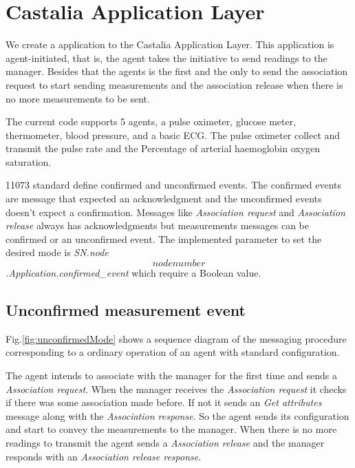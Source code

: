 \section{Castalia Application Layer}

We create a application to the Castalia Application Layer. This application is agent-initiated, that is, the agent takes the initiative to send readings to the manager. Besides that the agents is the first and the only to send the association request to start sending measurements and the association release when there is no more measurements to be sent.

The current code supports 5 agents, a pulse oximeter, glucose meter, thermometer, blood pressure, and a basic ECG. The pulse oximeter collect and transmit the pulse rate and the Percentage of arterial haemoglobin oxygen saturation.

11073 standard define confirmed and unconfirmed events. The confirmed events are message that expected an acknowledgment and the unconfirmed events doesn't expect a confirmation. Messages like \textit{Association request} and \textit{Association release} always has acknowledgments but measurements messages can be confirmed or an unconfirmed event. The implemented parameter to set the desired mode is \textit{SN.node\[node number\].Application.confirmed\_event} which require a Boolean value.

\subsection{Unconfirmed measurement event}\label{sec:UnconfirmedMeasurementEvent}

Fig.\ref{fig:unconfirmedMode} shows a sequence diagram of the messaging procedure corresponding to a ordinary operation of an agent with standard configuration.

The agent intends to associate with the manager for the first time and sends a \textit{Association request}. When the manager receives the \textit{Association request} it checks if there was some association made before. If not it sends an \textit{Get attributes} message along with the \textit{Association response}. So the agent sends its configuration and start to convey the measurements to the manager. When there is no more readings to transmit the agent sends a \textit{Association release} and the manager responds with an \textit{Association release response}.

